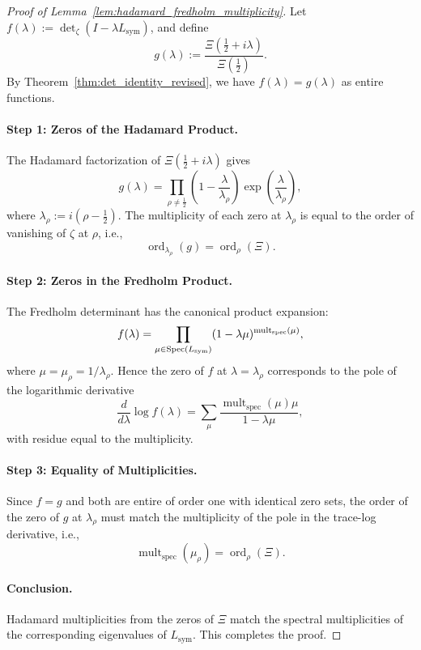 \begin{proof}[Proof of Lemma~\ref{lem:hadamard_fredholm_multiplicity}]
Let \( f(\lambda) := \det\nolimits_\zeta(I - \lambda L_{\mathrm{sym}}) \), and define
\[
g(\lambda) := \frac{\Xi\left( \tfrac{1}{2} + i\lambda \right)}{\Xi\left( \tfrac{1}{2} \right)}.
\]
By Theorem~\ref{thm:det_identity_revised}, we have \( f(\lambda) = g(\lambda) \) as entire functions.

\paragraph{Step 1: Zeros of the Hadamard Product.}
The Hadamard factorization of \( \Xi\left( \tfrac{1}{2} + i\lambda \right) \) gives
\[
g(\lambda) = \prod_{\rho \ne \tfrac{1}{2}} \left(1 - \frac{\lambda}{\lambda_\rho}\right) \exp\left( \frac{\lambda}{\lambda_\rho} \right),
\]
where \( \lambda_\rho := i(\rho - \tfrac{1}{2}) \). The multiplicity of each zero at \( \lambda_\rho \) is equal to the order of vanishing of \( \zeta \) at \( \rho \), i.e.,
\[
\operatorname{ord}_{\lambda_\rho}(g) = \operatorname{ord}_\rho(\Xi).
\]

\paragraph{Step 2: Zeros in the Fredholm Product.}
The Fredholm determinant has the canonical product expansion:
\[
f(\lambda) = \prod_{\mu \in \operatorname{Spec}(L_{\mathrm{sym}})} (1 - \lambda \mu)^{\operatorname{mult}_{\mathrm{spec}}(\mu)},
\]
where \(\mu = \mu_\rho = 1/\lambda_\rho\). Hence the zero of \( f \) at \( \lambda = \lambda_\rho \) corresponds to the pole of the logarithmic derivative
\[
\frac{d}{d\lambda} \log f(\lambda) = \sum_\mu \frac{\operatorname{mult}_{\mathrm{spec}}(\mu) \mu}{1 - \lambda \mu},
\]
with residue equal to the multiplicity.

\paragraph{Step 3: Equality of Multiplicities.}
Since \( f = g \) and both are entire of order one with identical zero sets, the order of the zero of \( g \) at \( \lambda_\rho \) must match the multiplicity of the pole in the trace-log derivative, i.e.,
\[
\operatorname{mult}_{\mathrm{spec}}(\mu_\rho) = \operatorname{ord}_\rho(\Xi).
\]

\paragraph{Conclusion.}
Hadamard multiplicities from the zeros of \( \Xi \) match the spectral multiplicities of the corresponding eigenvalues of \( L_{\mathrm{sym}} \). This completes the proof.
\end{proof}
% 